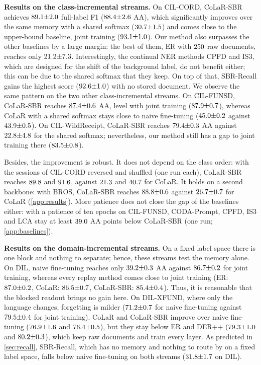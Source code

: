 \documentclass[10pt,twocolumn,letterpaper]{article}
\newcommand{\runin}[1]{\par\addvspace{0.7ex plus .3ex minus .1ex}\noindent\textbf{#1}\hspace{1em}\ignorespaces}
\begin{document}
\runin{Results on the class-incremental streams.} On CIL-CORD, CoLaR-SBR achieves $89.1{\pm}2.0$ full-label F1 ($88.4{\pm}2.6$ AA), which significantly improves over the same memory with a shared softmax ($30.7{\pm}1.5$) and comes close to the upper-bound baseline, joint training ($93.1{\pm}1.0$). Our method also surpasses the other baselines by a large margin: the best of them, ER with $250$ raw documents, reaches only $21.2{\pm}7.3$. Interestingly, the continual NER methods CPFD and IS3, which are designed for the shift of the background label, do not benefit either; this can be due to the shared softmax that they keep. On top of that, SBR-Recall gains the highest score ($92.6{\pm}1.0$) with no stored document. We observe the same pattern on the two other class-incremental streams. On CIL-FUNSD, CoLaR-SBR reaches $87.4{\pm}0.6$ AA, level with joint training ($87.9{\pm}0.7$), whereas CoLaR with a shared softmax stays close to naive fine-tuning ($45.0{\pm}0.2$ against $43.9{\pm}0.5$). On CIL-WildReceipt, CoLaR-SBR reaches $79.4{\pm}0.3$ AA against $22.8{\pm}4.8$ for the shared softmax; nevertheless, our method still has a gap to joint training there ($83.5{\pm}0.8$).

Besides, the improvement is robust. It does not depend on the class order: with the sessions of CIL-CORD reversed and shuffled (one run each), CoLaR-SBR reaches $89.8$ and $91.6$, against $21.3$ and $40.7$ for CoLaR. It holds on a second backbone: with BROS, CoLaR-SBR reaches $88.8{\pm}0.6$ against $26.7{\pm}0.7$ for CoLaR (\cref{app:results}). More patience does not close the gap of the baselines either: with a patience of ten epochs on CIL-FUNSD, CODA-Prompt, CPFD, IS3 and LCA stay at least $39.0$ AA points below CoLaR-SBR (one run; \cref{app:baselines}).

\runin{Results on the domain-incremental streams.} On a fixed label space there is one block and nothing to separate; hence, these streams test the memory alone. On DIL, naive fine-tuning reaches only $39.2{\pm}0.3$ AA against $86.7{\pm}0.2$ for joint training, whereas every replay method comes close to joint training (ER: $87.0{\pm}0.2$, CoLaR: $86.5{\pm}0.7$, CoLaR-SBR: $85.4{\pm}0.4$). Thus, it is reasonable that the blocked readout brings no gain here. On DIL-XFUND, where only the language changes, forgetting is milder ($71.2{\pm}0.7$ for naive fine-tuning against $79.5{\pm}0.4$ for joint training). CoLaR and CoLaR-SBR improve over naive fine-tuning ($76.9{\pm}1.6$ and $76.4{\pm}0.5$), but they stay below ER and DER++ ($79.3{\pm}1.0$ and $80.2{\pm}0.3$), which keep raw documents and train every layer. As predicted in \cref{sec:recall}, SBR-Recall, which has no memory and nothing to route by on a fixed label space, falls below naive fine-tuning on both streams ($31.8{\pm}1.7$ on DIL).
\end{document}
